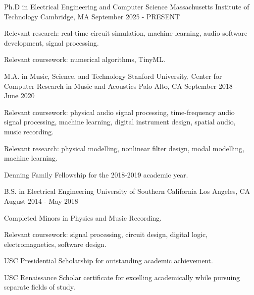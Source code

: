 

\begin{cventries}

    \cventry
    {Ph.D in Electrical Engineering and Computer Science} %
    {Massachusetts Institute of Technology} %
    {Cambridge, MA} %
    {September 2025 - PRESENT} %
    {
      \begin{cvitems} %
        \item {Relevant research: real-time circuit simulation, machine learning, audio software development, signal processing.}
        \item {Relevant coursework: numerical algorithms, TinyML.}
      \end{cvitems}
    }

    \cventry
    {M.A. in Music, Science, and Technology} %
    {Stanford University, Center for Computer Research in Music and Acoustics} %
    {Palo Alto, CA} %
    {September 2018 - June 2020} %
    {
      \begin{cvitems} %
        \item {Relevant coursework: physical audio signal processing, time-frequency audio signal processing,
        machine learning, digital instrument design, spatial audio, music recording.}
        \item {Relevant research: physical modelling, nonlinear filter design,
        modal modelling, machine learning.}
        \item {Denning Family Fellowship for the 2018-2019 academic year.}
      \end{cvitems}
    }

    \cventry
    {B.S. in Electrical Engineering} %
    {University of Southern California} %
    {Los Angeles, CA} %
    {August 2014 - May 2018} %
    {
      \begin{cvitems} %
        \item {Completed Minors in Physics and Music Recording.}
        \item {Relevant coursework: signal processing, circuit design, digital logic, electromagnetics, software design.}
        \item {USC Presidential Scholarship for outstanding academic achievement.}
        \item {USC Renaissance Scholar certificate for excelling academically while pursuing separate fields of study.}
      \end{cvitems}
    }

\end{cventries}
